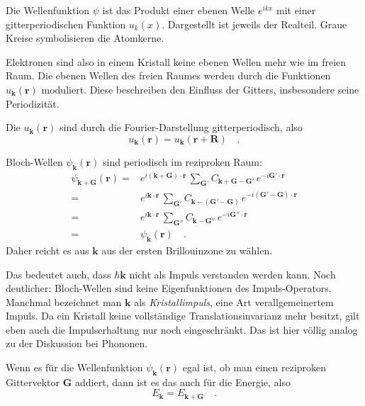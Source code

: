 \begin{marginfigure}
    \caption{Die Wellenfunktion $\psi$ ist das Produkt einer ebenen Welle $e^{i k x}$ mit einer gitterperiodischen Funktion $u_k(x)$. Dargestellt ist jeweils der Realteil. Graue Kreise symbolisieren die Atomkerne. }
\end{marginfigure}

Elektronen sind also in einem Kristall keine ebenen Wellen mehr wie im freien Raum. Die ebenen Wellen des freien Raumes  werden durch die Funktionen $u_\mathbf{k}(\mathbf{r})$ moduliert. Diese beschreiben den Einfluss der Gitters, insbesondere seine Periodizität. 


Die  $u_\mathbf{k}(\mathbf{r})$ sind durch die Fourier-Darstellung gitterperiodisch, also 
\begin{equation}
    u_\mathbf{k}(\mathbf{r}) =u_\mathbf{k}(\mathbf{r + R }) \quad .
\end{equation}

Bloch-Wellen $\psi_\mathbf{k}(\mathbf{r})$ sind periodisch im reziproken Raum:
\begin{eqnarray}
    \psi_{\mathbf{k} + \mathbf{G}}(\mathbf{r}) = & 
     e^{i (\mathbf{k} + \mathbf{G}) \cdot \mathbf{r} } \, \sum_{\mathbf{G}'} C_{\mathbf{k} +  \mathbf{G} -\mathbf{G}'} \, e^{-i \mathbf{G}' \cdot \mathbf{r} } \\
     = &  e^{i \mathbf{k}  \cdot \mathbf{r} } \, \sum_{\mathbf{G}'} C_{\mathbf{k} - (\mathbf{G}' -\mathbf{G})} \, e^{-i (\mathbf{G}' - \mathbf{G}) \cdot \mathbf{r} } \\
     = &  e^{i \mathbf{k}  \cdot \mathbf{r} } \, \sum_{\mathbf{G}''} C_{\mathbf{k} - \mathbf{G}''} \, e^{-i \mathbf{G}''   \cdot \mathbf{r} } \\
 = &  \psi_{\mathbf{k}}(\mathbf{r})  \quad .
    \end{eqnarray}
Daher reicht es aus $\mathbf{k}$ aus der ersten Brillouinzone zu wählen.

Das bedeutet auch, dass $\hbar \mathbf{k}$ nicht als Impuls verstanden werden kann. Noch deutlicher: Bloch-Wellen sind keine Eigenfunktionen des Impuls-Operators. Manchmal bezeichnet man  $\mathbf{k}$ als \emph{Kristallimpuls}, eine Art verallgemeinertem Impuls. Da ein Kristall keine vollständige Translationsinvarianz mehr besitzt, gilt eben auch die Impulserhaltung nur noch eingeschränkt. Das ist hier völlig analog zu der Diskussion bei Phononen. 

Wenn es für die Wellenfunktion $ \psi_{\mathbf{k}}(\mathbf{r}) $ egal ist, ob man einen reziproken Gittervektor $\mathbf{G}$ addiert, dann ist es das auch für die Energie, also
\begin{equation}
    E_\mathbf{k} = E_{\mathbf{k} + \mathbf{G}} \quad .
\end{equation}



